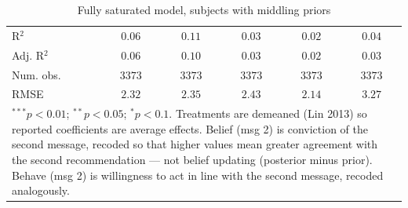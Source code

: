 \begin{table}
\begin{center}
\begin{tabular}{l c c c c c}
\hline
R$^2$                                             & $0.06$        & $0.11$        & $0.03$       & $0.02$        & $0.04$        \\
Adj. R$^2$                                        & $0.06$        & $0.10$        & $0.03$       & $0.02$        & $0.03$        \\
Num. obs.                                         & $3373$        & $3373$        & $3373$       & $3373$        & $3373$        \\
RMSE                                              & $2.32$        & $2.35$        & $2.43$       & $2.14$        & $3.27$        \\
\hline
\multicolumn{6}{l}{\scriptsize{\item $^{***}p<0.01$; $^{**}p<0.05$; $^{*}p<0.1$. Treatments are demeaned (Lin 2013) so reported coefficients are average effects. Belief (msg 2) is conviction of the second message, recoded so that higher values mean greater agreement with the second recommendation --- not belief updating (posterior minus prior). Behave (msg 2) is willingness to act in line with the second message, recoded analogously.}}
\end{tabular}
\caption{Fully saturated model, subjects with middling priors}
\label{tab:saturated_med_priors}
\end{center}
\end{table}

